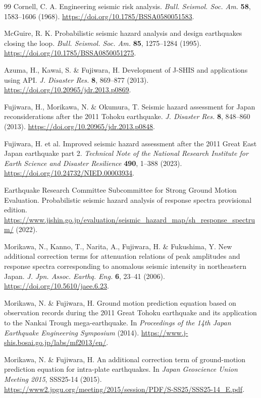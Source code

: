 \documentclass[11pt]{article}
\begin{document}
\begin{thebibliography}{99}
 Cornell, C. A. Engineering seismic risk analysis. \textit{Bull. Seismol. Soc. Am.} \textbf{58}, 1583--1606 (1968). \url{https://doi.org/10.1785/BSSA0580051583}.

 McGuire, R. K. Probabilistic seismic hazard analysis and design earthquakes closing the loop. \textit{Bull. Seismol. Soc. Am.} \textbf{85}, 1275--1284 (1995). \url{https://doi.org/10.1785/BSSA0850051275}.

 Azuma, H., Kawai, S. \& Fujiwara, H. Development of J-SHIS and applications using API. \textit{J. Disaster Res.} \textbf{8}, 869--877 (2013). \url{https://doi.org/10.20965/jdr.2013.p0869}.

 Fujiwara, H., Morikawa, N. \& Okumura, T. Seismic hazard assessment for Japan reconsiderations after the 2011 Tohoku earthquake. \textit{J. Disaster Res.} \textbf{8}, 848--860 (2013). \url{https://doi.org/10.20965/jdr.2013.p0848}.

 Fujiwara, H. et al. Improved seismic hazard assessment after the 2011 Great East Japan earthquake part 2. \textit{Technical Note of the National Research Institute for Earth Science and Disaster Resilience} \textbf{490}, 1--388 (2023). \url{https://doi.org/10.24732/NIED.00003934}.

 Earthquake Research Committee Subcommittee for Strong Ground Motion Evaluation. Probabilistic seismic hazard analysis of response spectra provisional edition. \url{https://www.jishin.go.jp/evaluation/seismic_hazard_map/sh_response_spectrum/} (2022).

 Morikawa, N., Kanno, T., Narita, A., Fujiwara, H. \& Fukushima, Y. New additional correction terms for attenuation relations of peak amplitudes and response spectra corresponding to anomalous seismic intensity in northeastern Japan. \textit{J. Jpn. Assoc. Earthq. Eng.} \textbf{6}, 23--41 (2006). \url{https://doi.org/10.5610/jaee.6.23}.

 Morikawa, N. \& Fujiwara, H. Ground motion prediction equation based on observation records during the 2011 Great Tohoku earthquake and its application to the Nankai Trough mega-earthquake. In \textit{Proceedings of the 14th Japan Earthquake Engineering Symposium} (2014). \url{https://www.j-shis.bosai.go.jp/labs/mf2013/en/}.

 Morikawa, N. \& Fujiwara, H. An additional correction term of ground-motion prediction equation for intra-plate earthquakes. In \textit{Japan Geoscience Union Meeting 2015}, SSS25-14 (2015). \url{https://www2.jpgu.org/meeting/2015/session/PDF/S-SS25/SSS25-14_E.pdf}.

\end{thebibliography}
\end{document}
